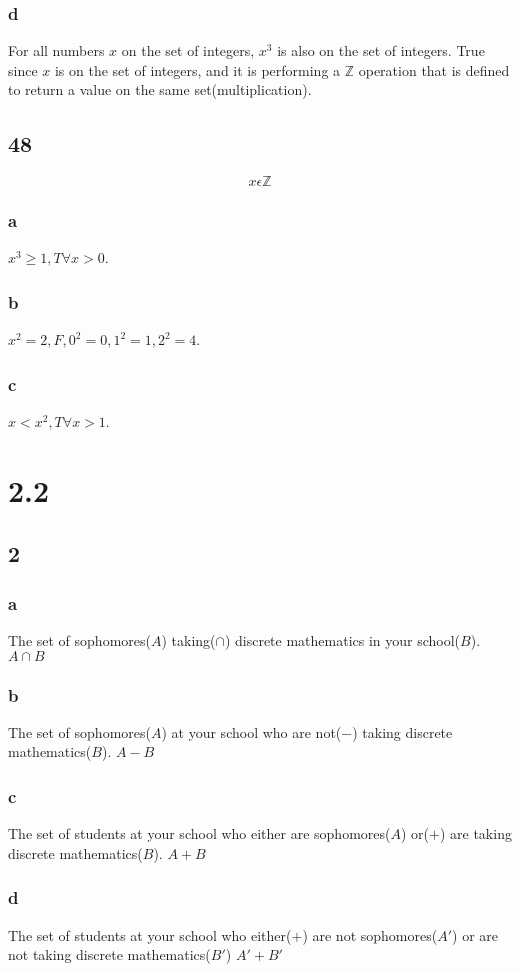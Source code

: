 \documentclass[journal]{IEEEtran}
\begin{document}
	\subsubsection{d}
	For all numbers $x$ on the set of integers, $x^3$ is also on the set of integers. True since 
	$x$ is on the set of integers, and it is performing a $\mathbb{Z}$ operation that is defined to return
	a value on the same set(multiplication).

	\subsection*{48}
		$$x \epsilon \mathbb{Z}$$
	\subsubsection{a}
	$x^3 \ge 1, \boxed{T} \forall x > 0$.

	\subsubsection{b}
	$x^2 = 2, \boxed{F}, 0^2 = 0, 1^2 = 1, 2^2 = 4$. 

	\subsubsection{c}
	$x < x^2, \boxed{T} \forall x > 1$.

\section*{2.2}
	\subsection*{2}
	\subsubsection{a}
	The set of sophomores($A$) taking($\cap$) discrete mathematics in your school($B$).
	$\boxed{A \cap B}$

	\subsubsection{b}
	The set of sophomores($A$) at your school who are not($-$) taking discrete mathematics($B$).
	$\boxed{A-B}$

	\subsubsection{c}
	The set of students at your school who either are sophomores($A$) or($+$) are taking discrete mathematics($B$).
	$\boxed{A+B}$

	\subsubsection{d}
	The set of students at your school who either($+$) are not sophomores($A'$) or are not taking discrete mathematics($B'$)
	$\boxed{A'+B'}$
\end{document}
